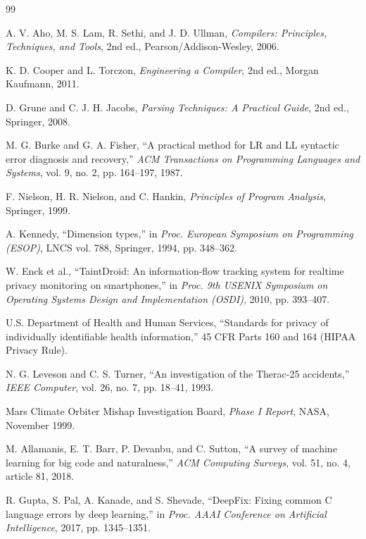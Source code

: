 \small
\begin{thebibliography}{99}
\setlength{\itemsep}{1pt}

A. V. Aho, M. S. Lam, R. Sethi, and J. D. Ullman,
\textit{Compilers: Principles, Techniques, and Tools},
2nd ed., Pearson/Addison-Wesley, 2006.

K. D. Cooper and L. Torczon,
\textit{Engineering a Compiler},
2nd ed., Morgan Kaufmann, 2011.

D. Grune and C. J. H. Jacobs,
\textit{Parsing Techniques: A Practical Guide},
2nd ed., Springer, 2008.

M. G. Burke and G. A. Fisher,
``A practical method for LR and LL syntactic error diagnosis and recovery,''
\textit{ACM Transactions on Programming Languages and Systems}, vol. 9, no. 2, pp. 164--197, 1987.

F. Nielson, H. R. Nielson, and C. Hankin,
\textit{Principles of Program Analysis},
Springer, 1999.

A. Kennedy,
``Dimension types,''
in \textit{Proc. European Symposium on Programming (ESOP)}, LNCS vol. 788, Springer, 1994, pp. 348--362.

W. Enck et al.,
``TaintDroid: An information-flow tracking system for realtime privacy monitoring on smartphones,''
in \textit{Proc. 9th USENIX Symposium on Operating Systems Design and Implementation (OSDI)}, 2010, pp. 393--407.

U.S. Department of Health and Human Services,
``Standards for privacy of individually identifiable health information,''
45 CFR Parts 160 and 164 (HIPAA Privacy Rule).

N. G. Leveson and C. S. Turner,
``An investigation of the Therac-25 accidents,''
\textit{IEEE Computer}, vol. 26, no. 7, pp. 18--41, 1993.

Mars Climate Orbiter Mishap Investigation Board,
\textit{Phase I Report},
NASA, November 1999.

M. Allamanis, E. T. Barr, P. Devanbu, and C. Sutton,
``A survey of machine learning for big code and naturalness,''
\textit{ACM Computing Surveys}, vol. 51, no. 4, article 81, 2018.

R. Gupta, S. Pal, A. Kanade, and S. Shevade,
``DeepFix: Fixing common C language errors by deep learning,''
in \textit{Proc. AAAI Conference on Artificial Intelligence}, 2017, pp. 1345--1351.


\end{thebibliography}

